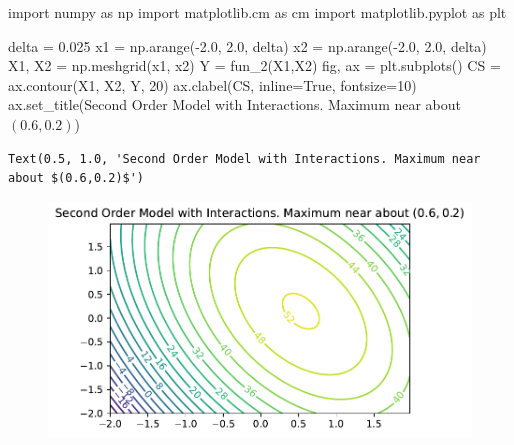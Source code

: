 \documentclass[
  letterpaper,
  DIV=11,
  numbers=noendperiod]{scrreprt}
\newenvironment{Shaded}{\begin{snugshade}}{\end{snugshade}}
\newcommand{\DecValTok}[1]{\textcolor[rgb]{0.68,0.00,0.00}{#1}}
\newcommand{\FloatTok}[1]{\textcolor[rgb]{0.68,0.00,0.00}{#1}}
\newcommand{\ImportTok}[1]{\textcolor[rgb]{0.00,0.46,0.62}{#1}}
\newcommand{\NormalTok}[1]{\textcolor[rgb]{0.00,0.23,0.31}{#1}}
\newcommand{\OperatorTok}[1]{\textcolor[rgb]{0.37,0.37,0.37}{#1}}
\newcommand{\StringTok}[1]{\textcolor[rgb]{0.13,0.47,0.30}{#1}}
\newcommand{\VariableTok}[1]{\textcolor[rgb]{0.07,0.07,0.07}{#1}}
\begin{document}
\begin{Shaded}
\begin{Highlighting}[]
\ImportTok{import}\NormalTok{ numpy }\ImportTok{as}\NormalTok{ np}
\ImportTok{import}\NormalTok{ matplotlib.cm }\ImportTok{as}\NormalTok{ cm}
\ImportTok{import}\NormalTok{ matplotlib.pyplot }\ImportTok{as}\NormalTok{ plt}

\NormalTok{delta }\OperatorTok{=} \FloatTok{0.025}
\NormalTok{x1 }\OperatorTok{=}\NormalTok{ np.arange(}\OperatorTok{{-}}\FloatTok{2.0}\NormalTok{, }\FloatTok{2.0}\NormalTok{, delta)}
\NormalTok{x2 }\OperatorTok{=}\NormalTok{ np.arange(}\OperatorTok{{-}}\FloatTok{2.0}\NormalTok{, }\FloatTok{2.0}\NormalTok{, delta)}
\NormalTok{X1, X2 }\OperatorTok{=}\NormalTok{ np.meshgrid(x1, x2)}
\NormalTok{Y }\OperatorTok{=}\NormalTok{ fun\_2(X1,X2)}
\NormalTok{fig, ax }\OperatorTok{=}\NormalTok{ plt.subplots()}
\NormalTok{CS }\OperatorTok{=}\NormalTok{ ax.contour(X1, X2, Y, }\DecValTok{20}\NormalTok{)}
\NormalTok{ax.clabel(CS, inline}\OperatorTok{=}\VariableTok{True}\NormalTok{, fontsize}\OperatorTok{=}\DecValTok{10}\NormalTok{)}
\NormalTok{ax.set\_title(}\StringTok{\textquotesingle{}Second Order Model with Interactions. Maximum near about $(0.6,0.2)$\textquotesingle{}}\NormalTok{)}
\end{Highlighting}
\end{Shaded}

\begin{verbatim}
Text(0.5, 1.0, 'Second Order Model with Interactions. Maximum near about $(0.6,0.2)$')
\end{verbatim}

\begin{figure}[H]

{\centering \includegraphics{005_num_rsm_files/figure-pdf/cell-9-output-2.pdf}

}

\end{figure}
\end{document}

